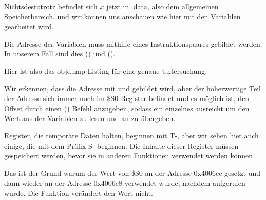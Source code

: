 Nichtsdestotrotz befindet sich $x$ jetzt in .data, also dem allgemeinen Speicherbereich, und wir können uns anschauen
wie hier mit den Variablen gearbeitet wird.

Die Adresse der Variablen muss mithilfe eines Instruktionspaares gebildet werden.
In unserem Fall sind dies  () und  ().

Hier ist also das objdump Listing für eine genaue Untersuchung:



Wir erkennen, dass die Adresse mit  und  gebildet wird, aber der höherwertige Teil der Adresse sich
immer noch im \$S0 Register befindet und es möglich ist, den Offset durch einen  () Befehl
anzugeben, sodass ein einzelnes  ausreicht um den Wert aus der Variablen zu lesen und an \printf zu übergeben.

Register, die temporäre Daten halten, beginnen mit T-, aber wir sehen hier auch einige, die mit dem Präfix S- beginnen.
Die Inhalte dieser Register müssen gespeichert werden, bevor sie in anderen Funktionen verwendet werden können.

Das ist der Grund warum der Wert von \$S0 an der Adresse 0x4006cc gesetzt und dann wieder an der Adresse 0x4006e8
verwendet wurde, nachdem \scanf aufgerufen wurde. Die Funktion \scanf verändert den Wert nicht.

